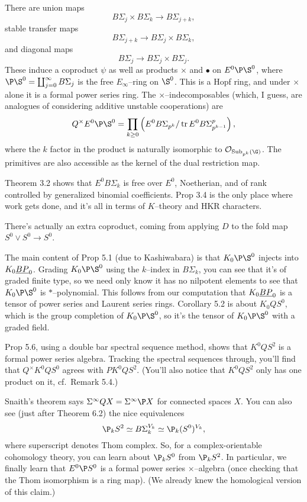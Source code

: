 There are union maps \[B\Sigma_j \times B\Sigma_k \to B\Sigma_{j+k},\] stable transfer maps \[B\Sigma_{j+k} \to B\Sigma_j \times B\Sigma_k,\] and diagonal maps \[B\Sigma_j \to B\Sigma_j \times B\Sigma_j.\]  These induce a coproduct $\psi$ as well as products $\times$ and $\bullet$ on $E^0 \P \S^0$, where $\P\S^0 = \coprod_{j=0}^\infty B\Sigma_j$ is the free $E_\infty$--ring on $\S^0$.  This is a Hopf ring, and under $\times$ alone it is a formal power series ring.  The $\times$--indecomposables (which, I guess, are analogues of considering additive unstable cooperations) are \[Q^\times E^0 \P\S^0 = \prod_{k \ge 0} \left( E^0 B\Sigma_{p^k} / \operatorname{tr} E^0 B\Sigma_{p^{k-1}}^p \right),\] where the $k${\th} factor in the product is naturally isomorphic to $\sheaf{O}_{\Sub_{p^k}(\G)}$.  The primitives are also accessible as the kernel of the dual restriction map.

Theorem 3.2 shows that $E^0 B\Sigma_k$ is free over $E^0$, Noetherian, and of rank controlled by generalized binomial coefficients.  Prop 3.4 is the only place where work gets done, and it's all in terms of $K$--theory and HKR characters.

There's actually an extra coproduct, coming from applying $D$ to the fold map $S^0 \vee S^0 \to S^0$.

The main content of Prop 5.1 (due to Kashiwabara) is that $K_0 \P \S^0$ injects into $K_0 \underline{\smash{BP}}_{0}$.  Grading $K_0 \P \S^0$ using the $k$--index in $B\Sigma_k$, you can see that it's of graded finite type, so we need only know it has no nilpotent elements to see that $K_0 \P \S^0$ is $\ast$--polynomial.  This follows from our computation that $K_0 \underline{\smash{BP}}_{0}$ is a tensor of power series and Laurent series rings.  Corollary 5.2 is about $K_0 Q S^0$, which is the group completion of $K_0 \P \S^0$, so it's the tensor of $K_0 \P \S^0$ with a graded field.

Prop 5.6, using a double bar spectral sequence method, shows that $K^0 Q S^2$ is a formal power series algebra.  Tracking the spectral sequences through, you'll find that $Q^\times K^0 Q S^0$ agrees with $P K^0 Q S^2$.  (You'll also notice that $K^0 Q S^2$ only has one product on it, cf.\ Remark 5.4.)

Snaith's theorem says $\Sigma^\infty QX = \Sigma^\infty \P X$ for connected spaces $X$.  You can also see (just after Theorem 6.2) the nice equivalences \[\P_k S^2 \simeq B\Sigma_k^{V_k} \simeq \P_k(S^0)^{V_k},\] where superscript denotes Thom complex.  So, for a complex-orientable cohomology theory, you can learn about $\P_k S^0$ from $\P_k S^2$.  In particular, we finally learn that $E^0 \P S^0$ is a formal power series $\times$--algebra (once checking that the Thom isomorphism is a ring map).  (We already knew the homological version of this claim.)

